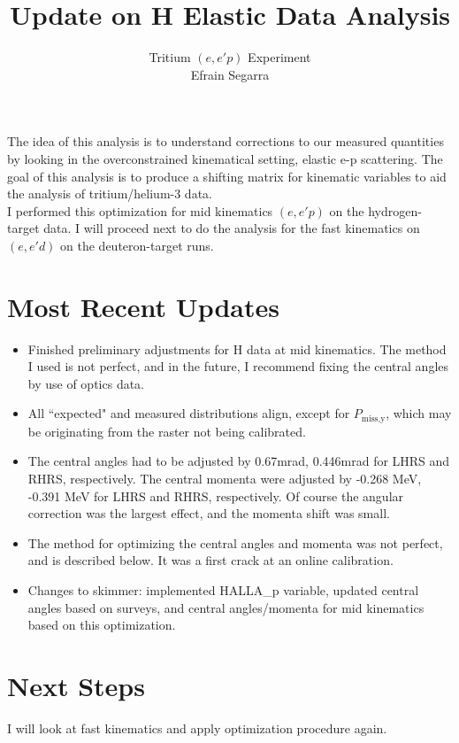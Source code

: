 \documentclass{article}
\title{Update on H Elastic Data Analysis}
\author{Tritium $(e,e'p)$ Experiment\\Efrain Segarra}
\begin{document}
\maketitle

The idea of this analysis is to understand corrections to our measured quantities by looking in the overconstrained kinematical setting, elastic e-p scattering. The goal of this analysis is to produce a shifting matrix for kinematic variables to aid the analysis of tritium/helium-3 data.\\

I performed this optimization for mid kinematics $(e,e'p)$ on the hydrogen-target data. I will proceed next to do the analysis for the fast kinematics on $(e,e'd)$ on the deuteron-target runs.

\section*{Most Recent Updates}
\begin{itemize}
\item{Finished preliminary adjustments for H data at mid kinematics. The method I used is not perfect, and in the future, I recommend fixing the central angles by use of optics data.}
\item{All ``expected" and measured distributions align, except for $P_\textrm{miss,y}$, which may be originating from the raster not being calibrated.} 
\item{The central angles had to be adjusted by 0.67mrad, 0.446mrad for LHRS and RHRS, respectively. The central momenta were adjusted by -0.268 MeV, -0.391 MeV for LHRS and RHRS, respectively. Of course the angular correction was the largest effect, and the momenta shift was small.}
\item{The method for optimizing the central angles and momenta was not perfect, and is described below. It was a first crack at an online calibration.}
\item{Changes to skimmer: implemented HALLA\_p variable, updated central angles based on surveys, and central angles/momenta for mid kinematics based on this optimization.}
\end{itemize}

\section*{Next Steps}
I will look at fast kinematics and apply optimization procedure again.
\end{document}
